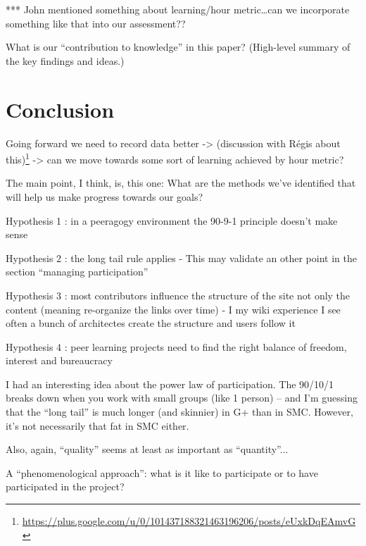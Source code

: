 \documentclass{acm_proc_article-sp}
\begin{document}
*** John mentioned something about learning/hour metric\ldots can we incorporate something like that into our assessment??

        What is our ``contribution to knowledge'' in this paper? (High-level summary of the key findings and ideas.)\cite{paragogy}
\cite{Origins}
\cite{Tales}
\cite{Peeragogy-2}
\cite{College}
\cite{Bridges}
\cite{peer}
\cite{Gluing}
\cite{GroupInformatics}
\cite{Why}
\cite{PeeragogyinAction}

%
%
%
%

\section{Conclusion}

Going forward we need to record data better -> (discussion with R\'egis about this)\footnote{\url{https://plus.google.com/u/0/101437188321463196206/posts/eUxkDqEAmvG}} -> can we move towards some sort of learning achieved by hour metric?

    The main point, I think, is, this one: What are the methods we've identified that will help us make progress towards our goals?

                Hypothesis 1 : in a peeragogy environment the 90-9-1 principle doesn't make sense

                Hypothesis 2 : the long tail rule applies - This may validate an other point in the section ``managing participation''

                Hypothesis 3 : most contributors influence the structure of the site not only the content (meaning re-organize the links over time) - I my wiki experience I see often a bunch of architectes create the structure and users follow it

                Hypothesis 4 : peer learning projects need to find the right balance of freedom, interest and bureaucracy

        I had an interesting idea about the power law of participation. The 90/10/1 breaks down when you work with small groups (like 1 person) -- and I'm guessing that the ``long tail'' is much longer (and skinnier) in G+ than in SMC. However, it's not necessarily that fat in SMC either.

        Also, again, ``quality'' seems at least as important as ``quantity''... 

    A ``phenomenological approach'': what is it like to participate or to have participated in the project?
\end{document}
